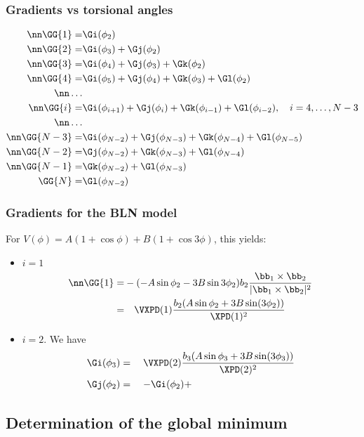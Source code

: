\clearpage
\subsubsection{Gradients vs torsional angles}

\begin{align}
  \nn\GG{1}=&\Gi(\phi_2)\\
  \nn\GG{2}=&\Gi(\phi_3)+\Gj(\phi_2)\\
  \nn\GG{3}=&\Gi(\phi_4)+\Gj(\phi_3)+\Gk(\phi_2)\\
  \nn\GG{4}=&\Gi(\phi_5)+\Gj(\phi_4)+\Gk(\phi_3)+\Gl(\phi_2)\\
  \nn\ldots\\
  \nn\GG{i}=&\Gi(\phi_{i+1})+\Gj(\phi_i)+\Gk(\phi_{i-1})+\Gl(\phi_{i-2}),\quad i=4,\ldots,N-3\\
  \nn\ldots\\
  \nn\GG{N-3}=&\Gi(\phi_{N-2})+\Gj(\phi_{N-3})+\Gk(\phi_{N-4})+\Gl(\phi_{N-5})\\
  \nn\GG{N-2}=&\Gj(\phi_{N-2})+\Gk(\phi_{N-3})+\Gl(\phi_{N-4})\\
  \nn\GG{N-1}=&\Gk(\phi_{N-2})+\Gl(\phi_{N-3})\\
  \GG{N}=&\Gl(\phi_{N-2})
\end{align}

\subsubsection{Gradients for the BLN model}

For $V(\phi)=A(1+\cos\phi)+B(1+\cos{3\phi})$, this yields:
\begin{itemize}
\item $i=1$ 
\begin{align}
  \nn\GG{1}=& -(-A\sin\phi_2-3B\sin{3\phi_2})
  b_2\frac{\bb_1\times\bb_2}{|\bb_1\times\bb_2|^2}\\
  =&\quad\VXPD(1)\frac{b_2(A\sin\phi_2+3B\sin(3\phi_2))}{\XPD(1)^2}
\end{align}
\item $i=2$. We have
  \begin{align}
    \Gi(\phi_3)&=\quad\VXPD(2)\frac{b_3(A\sin\phi_3+3B\sin(3\phi_3))}{\XPD(2)^2}\\
    \Gj(\phi_2)&=\quad -\Gi(\phi_2)+
  \end{align}
\end{itemize}

\subsection{Determination of the global minimum}


